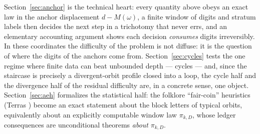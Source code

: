 \documentclass[11pt]{article}
\theoremstyle{remark}
\newcommand{\w}{\omega}
\begin{document}
Section~\ref{sec:anchor} is the technical heart: every quantity above obeys an exact law in the anchor displacement $d - M(\w)$, a finite window of digits and stratum labels then decides the next step in a trichotomy that never errs, and an elementary accounting argument shows each decision \emph{consumes} digits irreversibly. In these coordinates the difficulty of the problem is not diffuse: it is the question of where the digits of the anchors come from. Section~\ref{sec:cycles} tests the one regime where finite data can beat unbounded depth --- cycles --- and, since the staircase is precisely a divergent-orbit profile closed into a loop, the cycle half and the divergence half of the residual difficulty are, in a concrete sense, one object. Section~\ref{sec:aeh} formalizes the statistical half: the folklore ``fair-coin'' heuristics (Terras \cite{terras}) become an exact statement about the block letters of typical orbits, equivalently about an explicitly computable window law $\pi_{k,D}$, whose ledger consequences are unconditional theorems \emph{about} $\pi_{k,D}$.
\end{document}
